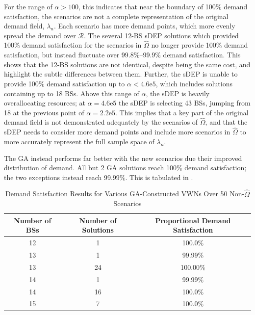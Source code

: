 \documentclass[12pt,dvipsnames]{report}
\newcommand{\expnumber}[2]{{#1}\mathrm{e}{#2}}
\begin{document}
For the range of $\alpha > 100$, this indicates that near the boundary of 100\% demand satisfaction, the scenarios are not a complete representation of the original demand field, $\lambda_n$.  Each scenario has more demand points, which more evenly spread the demand over $\mathcal{R}$.  The several 12-BS sDEP solutions which provided 100\% demand satisfaction for the scenarios in $\hat{\Omega}$ no longer provide 100\% demand satisfaction, but instead fluctuate over 99.8\%--99.9\% demand satisfaction.  This shows that the 12-BS solutions are not identical, despite being the same cost, and highlight the subtle differences between them.  Further, the sDEP is unable to provide 100\% demand satisfaction up to $\alpha < \expnumber{4.6}{5}$, which includes solutions containing up to 18 BSs.  Above this range of $\alpha$, the sDEP is heavily overallocating resources; at $\alpha = \expnumber{4.6}{5}$ the sDEP is selecting 43 BSs, jumping from 18 at the previous point of $\alpha = \expnumber{2.2}{5}$.  This implies that a key part of the original demand field is not demonstrated adequately by the scenarios of $\hat{\Omega}$, and that the sDEP needs to consider more demand points and include more scenarios in $\hat{\Omega}$ to more accurately represent the full sample space of $\lambda_n$.

The GA instead performs far better with the new scenarios due their improved distribution of demand.  All but 2 GA solutions reach 100\% demand satisfaction; the two exceptions instead reach 99.99\%.  This is tabulated in .

\begin{table}[htp]
\centering
\caption[Preliminary Simulation Demand Satisfaction of GA-Constructed VWNs and New Scenarios]{Demand Satisfaction Results for Various GA-Constructed VWNs Over 50 Non-$\hat{\Omega}$ Scenarios}
\begin{tabular}{|c|c|c|} 
\hline
\textbf{Number of BSs} & \textbf{Number of Solutions} & \textbf{Proportional Demand Satisfaction} \\
\hline
12 & 1 & 100.0\% \\
\hline
13 & 1 & 99.99\% \\
\hline
13 & 24 & 100.00\% \\
\hline
14 & 1 & 99.99\% \\
\hline
14 & 16 & 100.0\% \\
\hline
15 & 7 & 100.0\% \\
\hline
\end{tabular}
\label{tab:Prelim_GAEvalDemandSatisfaction}
\end{table}
\end{document}

